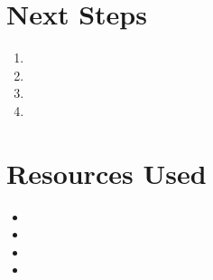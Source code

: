 \documentclass{article}
\begin{document}
\section{Next Steps}
\begin{enumerate}
  \item 
  \item 
  \item 
  \item 
\end{enumerate}

\section{Resources Used}
\begin{itemize}
  \item 
  \item 
  \item 
  \item 
\end{itemize}
\end{document}
